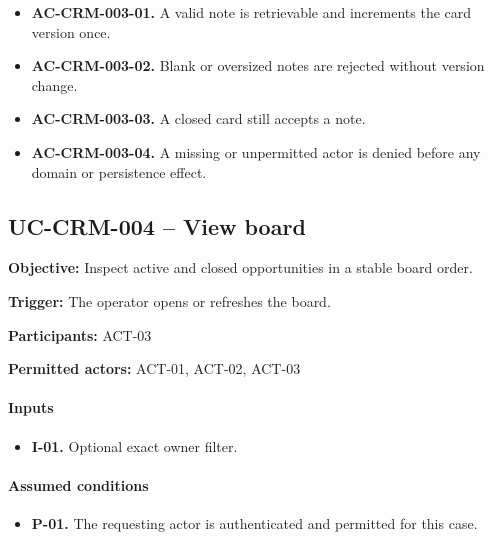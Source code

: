 \documentclass[10pt,a4paper]{article}
\begin{document}
\begin{itemize}

\item \textbf{AC-CRM-003-01.} A valid note is retrievable and increments the card version once.

\item \textbf{AC-CRM-003-02.} Blank or oversized notes are rejected without version change.

\item \textbf{AC-CRM-003-03.} A closed card still accepts a note.

\item \textbf{AC-CRM-003-04.} A missing or unpermitted actor is denied before any domain or persistence effect.

\end{itemize}

\subsection{UC-CRM-004 -- View board}

\textbf{Objective:} Inspect active and closed opportunities in a stable board order.

\textbf{Trigger:} The operator opens or refreshes the board.

\textbf{Participants:} ACT-03

\textbf{Permitted actors:} ACT-01, ACT-02, ACT-03

\paragraph{Inputs}

\begin{itemize}

\item \textbf{I-01.} Optional exact owner filter.

\end{itemize}

\paragraph{Assumed conditions}

\begin{itemize}

\item \textbf{P-01.} The requesting actor is authenticated and permitted for this case.

\end{itemize}
\end{document}

